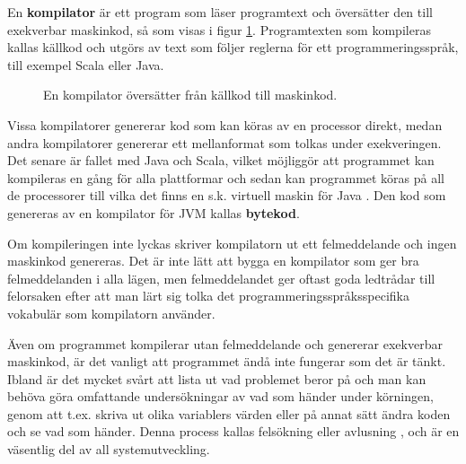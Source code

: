 En \textbf{kompilator}  är ett program som läser programtext och översätter den till exekverbar maskinkod, så som visas i figur \ref{fig:appendix:compiler}. Programtexten som kompileras kallas källkod och utgörs av text som följer reglerna för ett programmeringsspråk, till exempel Scala eller Java.

\begin{figure}[H]
\centering
{}
    \caption{En kompilator översätter från källkod till maskinkod.}
    \label{fig:appendix:compiler}
\end{figure}




Vissa kompilatorer genererar kod som kan köras av en processor direkt, medan andra kompilatorer genererar ett mellanformat som tolkas under exekveringen. Det senare är fallet med Java och Scala, vilket möjliggör att programmet kan kompileras en gång för alla plattformar och sedan kan programmet köras på all de processorer till vilka det finns en s.k. virtuell maskin för Java . Den kod som genereras av en kompilator för JVM kallas \textbf{bytekod}.

Om kompileringen inte lyckas skriver kompilatorn ut ett felmeddelande och ingen maskinkod genereras. Det är inte lätt att bygga en kompilator som ger bra felmeddelanden i alla lägen, men felmeddelandet ger oftast goda ledtrådar till felorsaken efter att man lärt sig tolka det programmeringsspråksspecifika vokabulär som kompilatorn använder.

Även om programmet kompilerar utan felmeddelande och genererar exekverbar maskinkod, är det vanligt att programmet ändå inte fungerar som det är tänkt. Ibland är det mycket svårt att lista ut vad problemet beror på och man kan behöva göra omfattande undersökningar av vad som händer under körningen, genom att t.ex. skriva ut olika variablers värden eller på annat sätt ändra koden och se vad som händer. Denna process kallas felsökning eller avlusning , och är en väsentlig del av all systemutveckling.

